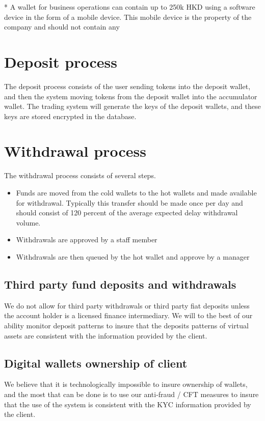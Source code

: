 * A wallet for business operations can contain up to 250k HKD using a
software device in the form of a mobile device.  This mobile device is
the property of the company and should not contain any

\section{Deposit process}
The deposit process consists of the user sending tokens into the
deposit wallet, and then the system moving tokens from the deposit
wallet into the accumulator wallet.  The trading system will generate
the keys of the deposit wallets, and these keys are stored encrypted
in the database.

\section{Withdrawal process}
The withdrawal process consists of several steps.
\begin{itemize}
  \item Funds are moved from the cold wallets to the hot wallets and
    made available for withdrawal.  Typically this transfer should be
    made once per day and should consist of 120 percent of the average
    expected delay withdrawal volume.
  \item Withdrawals are approved by a staff member
  \item Withdrawals are then queued by the hot wallet and approve by a manager
\end{itemize}

\subsection{Third party fund deposits and withdrawals}
We do not allow for third party withdrawals or third party fiat
deposits unless the account holder is a licensed finance intermediary.
We will to the best of our ability monitor deposit patterns to insure
that the deposits patterns of virtual assets are consistent with the
information provided by the client.

\subsection{Digital wallets ownership of client}
We believe that it is technologically impossible to insure ownership
of wallets, and the most that can be done is to use our anti-fraud /
CFT measures to insure that the use of the system is consistent with
the KYC information provided by the client.

